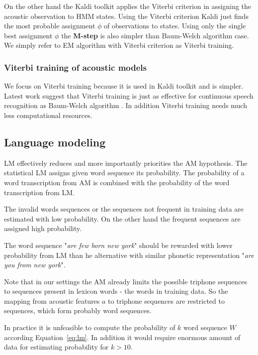 {
On the other hand the Kaldi toolkit applies the Viterbi 
criterion in assigning the acoustic observation to \ac{HMM} states.
Using the Viterbi criterion Kaldi just finds 
the most probable assignment $\phi$ of observations to states.\cite{buthpitiya2012parallel}
Using only the single best assignment $\phi$ the {\bf M-step} is also simpler than
Baum-Welch algorithm case.
We simply refer to \ac{EM} algorithm with Viterbi criterion as Viterbi training.

\subsubsection*{Viterbi training of acoustic models}
We focus on Viterbi training because it is used in Kaldi toolkit and is simpler.
Latest work suggest that Viterbi training is just as effective for continuous
speech recognition as Baum-Welch algorithm \cite{rodriguez2003comparative}.
In addition Viterbi training needs much less computational resources. 


\subsection{Language modeling}
\label{sub:lm}

\ac{LM} effectively reduces and more importantly priorities the \ac{AM} hypothesis.
The statistical \ac{LM} assigns given word sequence its probability.
The probability of a word transcription from \ac{AM} is combined with
the probability of the word transcription from \ac{LM}.

The invalid words sequences or the sequences not frequent in training data
are estimated with low probability. On the other hand the frequent sequences
are assigned high probability.

The word sequence "{\it are few born new york}" should be rewarded 
with lower probability from \ac{LM} than he alternative with similar phonetic representation
"{\it are you from new york}".

Note that in our settings the \ac{AM} already limits the possible triphone
sequences to sequences present in lexicon words - the words in training data.
So the mapping from acoustic features $a$ to triphone sequences
are restricted to sequences, which form probably word sequences.

In practice it is unfeasible to compute the probability
of $k$ word sequence $W$ according Equation~\ref{eq:lm}.
In addition it would require enormous amount of data for estimating
probability for $k>10$.


}
